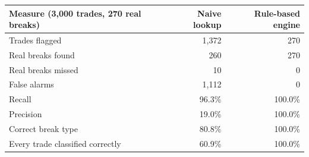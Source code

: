 \begin{tabular}{@{}lrr@{}}
\toprule
\textbf{Measure (3{,}000 trades, 270 real breaks)} & \textbf{Naive lookup} & \textbf{Rule-based engine} \\
\midrule
Trades flagged & 1,372 & 270 \\
Real breaks found & 260 & 270 \\
Real breaks missed & 10 & 0 \\
False alarms & 1,112 & 0 \\
Recall & 96.3\% & 100.0\% \\
Precision & 19.0\% & 100.0\% \\
Correct break type & 80.8\% & 100.0\% \\
Every trade classified correctly & 60.9\% & 100.0\% \\
\bottomrule
\end{tabular}